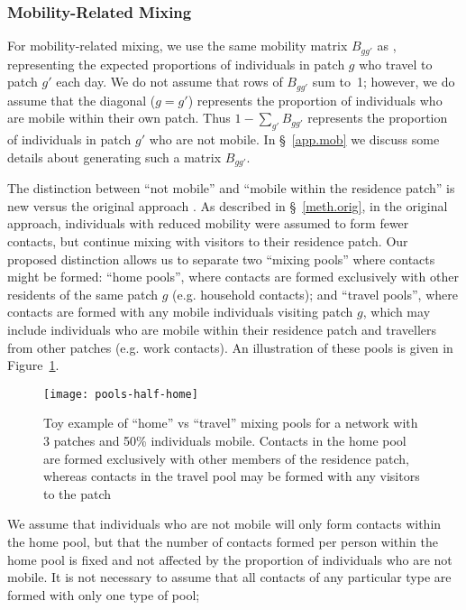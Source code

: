 \subsubsection{Mobility-Related Mixing}\label{meth.prop.mix.mob}
For mobility-related mixing, we use the same mobility matrix $B_{gg'}$ as \cite{Arenas2020},
representing the expected proportions of individuals in patch $g$ who travel to patch $g'$ each day.
We do not assume that rows of $B_{gg'}$ sum to~1;
however, we do assume that the diagonal ($g=g'$) represents
the proportion of individuals who are mobile within their own patch.
Thus $1 - \sum_{g'} B_{gg'}$ represents
the proportion of individuals in patch $g'$ who are not mobile.
In \S~\ref{app.mob} we discuss some details about generating such a matrix $B_{gg'}$.
\par
The distinction between ``not mobile'' and ``mobile within the residence patch''
is new versus the original approach \cite{Arenas2020}.
As described in \S~\ref{meth.orig}, in the original approach,
individuals with reduced mobility were assumed to form fewer contacts,
but continue mixing with visitors to their residence patch.
Our proposed distinction allows us to separate two ``mixing pools'' where contacts might be formed:
``home pools'', where contacts are formed exclusively with
other residents of the same patch $g$ (e.g. household contacts); and
``travel pools'', where contacts are formed with any mobile individuals visiting patch $g$,
which may include individuals who are mobile within their residence patch
and travellers from other patches (e.g. work contacts).
An illustration of these pools is given in Figure~\ref{fig:pools}.
\begin{figure}
  \centering
  \texttt{[image: pools-half-home]}
  \caption{Toy example of ``home'' vs ``travel'' mixing pools
    for a network with 3 patches and 50\% individuals mobile.
    Contacts in the home pool are formed exclusively with other members of the residence patch,
    whereas contacts in the travel pool may be formed with any visitors to the patch}
  \label{fig:pools}
\end{figure}
\par
We assume that individuals who are not mobile will only form contacts within the home pool,
but that the number of contacts formed per person within the home pool is fixed and not affected by
the proportion of individuals who are not mobile.
It is not necessary to assume that
all contacts of any particular type are formed with only one type of pool;
